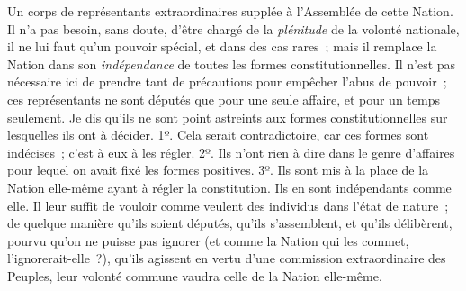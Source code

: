 \documentclass[french,twoside]{book} %
\begin{document}
Un corps de représentants extraordinaires supplée à l’Assemblée de cette Nation. Il n’a pas besoin, sans doute, d’être chargé de la {\itshape plénitude} de la volonté nationale, il ne lui faut qu’un pouvoir spécial, et dans des cas rares ; mais il remplace la Nation dans son {\itshape indépendance} de toutes les formes constitutionnelles. Il n’est pas nécessaire ici de prendre tant de précautions pour empêcher l’abus de pouvoir ; ces représentants ne sont députés que pour une seule affaire, et pour un temps seulement. Je dis qu’ils ne sont point astreints aux formes constitutionnelles sur lesquelles ils ont à décider. 1º. Cela serait contradictoire, car ces formes sont indécises ; c’est à eux à les régler. 2º. Ils n’ont rien à dire dans le genre d’affaires pour lequel on avait fixé les formes positives. 3º. Ils sont mis à la place de la Nation elle-même ayant à régler la constitution. Ils en sont indépendants comme elle. Il leur suffit de vouloir comme veulent des individus dans l’état de nature ; de quelque manière qu’ils soient députés, qu’ils s’assemblent, et qu’ils délibèrent, pourvu qu’on ne puisse pas ignorer (et comme la Nation qui les commet, l’ignorerait-elle ?), qu’ils agissent en vertu d’une commission extraordinaire des Peuples, leur volonté commune vaudra celle de la Nation elle-même.\par
\end{document}
